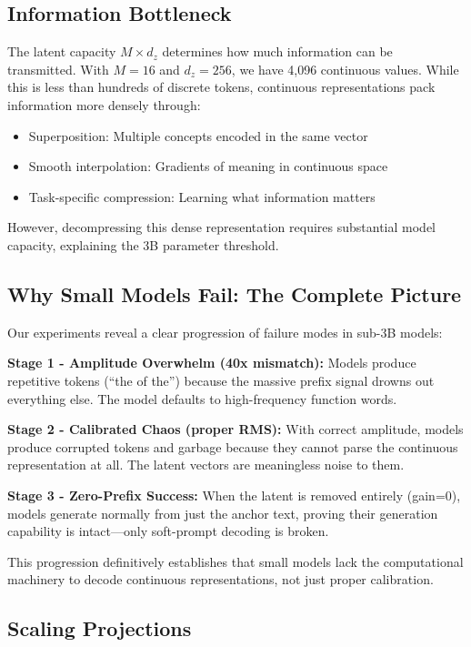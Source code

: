 \documentclass{article}
\begin{document}
\subsection{Information Bottleneck}

The latent capacity $M \times d_z$ determines how much information can be transmitted. With $M=16$ and $d_z=256$, we have 4,096 continuous values. While this is less than hundreds of discrete tokens, continuous representations pack information more densely through:
\begin{itemize}
\item Superposition: Multiple concepts encoded in the same vector
\item Smooth interpolation: Gradients of meaning in continuous space
\item Task-specific compression: Learning what information matters
\end{itemize}

However, decompressing this dense representation requires substantial model capacity, explaining the 3B parameter threshold.

\subsection{Why Small Models Fail: The Complete Picture}

Our experiments reveal a clear progression of failure modes in sub-3B models:

\textbf{Stage 1 - Amplitude Overwhelm (40x mismatch):} Models produce repetitive tokens (``the of the'') because the massive prefix signal drowns out everything else. The model defaults to high-frequency function words.

\textbf{Stage 2 - Calibrated Chaos (proper RMS):} With correct amplitude, models produce corrupted tokens and garbage because they cannot parse the continuous representation at all. The latent vectors are meaningless noise to them.

\textbf{Stage 3 - Zero-Prefix Success:} When the latent is removed entirely (gain=0), models generate normally from just the anchor text, proving their generation capability is intact—only soft-prompt decoding is broken.

This progression definitively establishes that small models lack the computational machinery to decode continuous representations, not just proper calibration.

\subsection{Scaling Projections}
\end{document}
